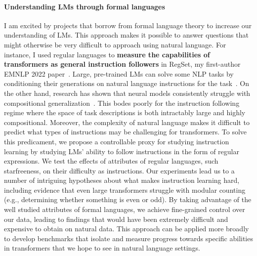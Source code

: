 \documentclass[11pt]{article}
\begin{document}
\paragraph{Understanding LMs through formal languages}

I am excited by projects 
that borrow from formal language theory
to increase our understanding of LMs.
This approach makes it possible to answer 
questions that might otherwise be very difficult to approach using natural language.
For instance, I used regular languages to 
\textbf{measure the capabilities of transformers as general instruction followers}
in RegSet, my first-author EMNLP 2022 paper~\cite{Finlayson2022WhatMI}. 
Large, pre-trained LMs can solve some NLP tasks 
by conditioning their generations on natural language instructions 
for the task~\cite{mishra2021crosstask, Wei2021FinetunedLM}. 
On the other hand, 
research has shown that neural models consistently struggle with
compositional generalization~\cite{Lake2018GeneralizationWS}. 
This bodes poorly for the instruction following regime
where the space of task descriptions is both intractably large 
and highly compositional.
Moreover, the complexity of natural language makes it difficult to
predict what types of instructions may be challenging for transformers.
To solve this predicament, 
we propose a controllable proxy for studying instruction learning
by studying LMs' ability to follow instructions in the form of regular expressions.
We test the effects of attributes of regular languages,
such starfreeness, on their difficulty as instructions.
Our experiments lead us to a number of intriguing hypotheses 
about what makes instruction learning hard, 
including evidence that even large transformers struggle with modular counting 
(e.g., determining whether something is even or odd). 
By taking advantage of the well studied attributes of formal languages,
we achieve fine-grained control over our data, leading to findings that
would have been extremely difficult and expensive to obtain on natural data.
This approach can be applied more broadly to develop benchmarks 
that isolate and measure progress towards specific abilities 
in transformers that we hope to see in natural language settings.
\end{document}

